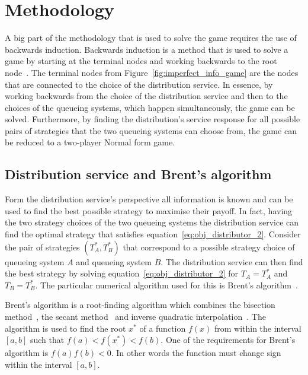 \section{Methodology}\label{sec:game_methodology}

A big part of the methodology that is used to solve the game requires the use of
backwards induction.
Backwards induction is a method that is used to solve a game by starting at the
terminal nodes and working backwards to the root node~\cite{watson2002strategy}.
The terminal nodes from Figure~\ref{fig:imperfect_info_game} are the nodes that
are connected to the choice of the distribution service.
In essence, by working backwards from the choice of the distribution service
and then to the choices of the queueing systems, which happen simultaneously,
the game can be solved.
Furthermore, by finding the distribution's service response for all possible
pairs of strategies that the two queueing systems can choose from, the game can
be reduced to a two-player Normal form game.


\subsection{Distribution service and Brent's algorithm}
\label{sec:best_response_distribution_service}

Form the distribution service's perspective all information is known and can be
used to find the best possible strategy to maximise their payoff.
In fact, having the two strategy choices of the two queueing systems the
distribution service can find the optimal strategy that satisfies
equation~\eqref{eq:obj_distributor_2}.
Consider the pair of strategies \((T_A^*, T_B^*)\) that correspond to a possible
strategy choice of queueing system \(A\) and queueing system \(B\).
The distribution service can then find the best strategy by solving
equation~\eqref{eq:obj_distributor_2} for \(T_A = T_A^*\) and \(T_B = T_B^*\).
The particular numerical algorithm used for this is Brent's
algorithm~\cite{brent_method}.

Brent's algorithm is a root-finding algorithm which combines the bisection
method~\cite{corliss1977root}, the secant method~\cite{secantmethod} and
inverse quadratic interpolation~\cite{epperson2021introduction}.
The algorithm is used to find the root \(x^*\) of a function \(f(x)\) from
within the interval \([a, b]\) such that \(f(a) < f(x^*) < f(b)\).
One of the requirements for Brent's algorithm is \(f(a)f(b) < 0\).
In other words the function must change sign within the interval \([a, b]\).

